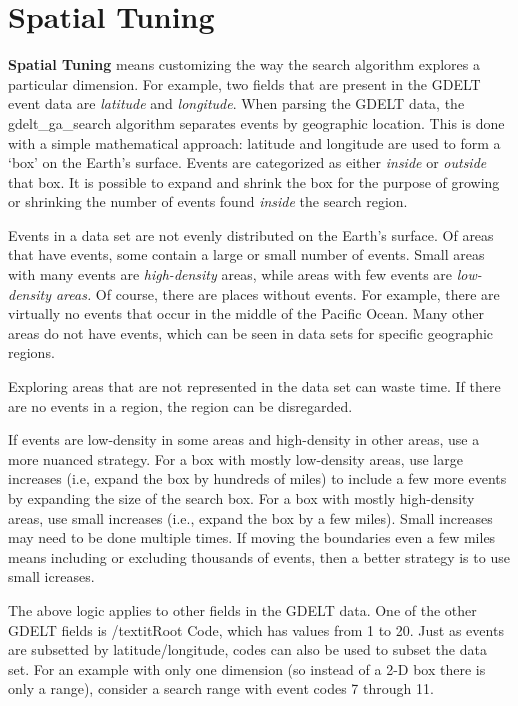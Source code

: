 
\chapter{Spatial Tuning}
\label{chapter:SpatialTuning}

\textbf{Spatial Tuning} means customizing the way the search algorithm explores a particular dimension.
For example, two fields that are present in the GDELT event data are \textit{latitude} and \textit{longitude}.
When parsing the GDELT data, the gdelt\_ga\_search algorithm separates events by geographic location.
This is done with a simple mathematical approach: latitude and longitude are used to form a `box' on the 
Earth's surface. 
Events are categorized as either \textit{inside} or \textit{outside} that box. 
It is possible to expand and shrink the box for the purpose of growing or shrinking the number of events found \textit{inside} the search region.

\par Events in a data set are not evenly distributed on the Earth's surface. 
Of areas that have events, some contain a large or small number of events.
Small areas with many events are \textit{high-density} areas, while areas with few events are \textit{low-density areas.}
Of course, there are places without events. 
For example, there are virtually no events that occur in the middle of the Pacific Ocean. 
Many other areas do not have events, which can be seen in data sets for specific geographic regions. 

\par Exploring areas that are not represented in the data set can waste time. If there are no events in a region, the region can be disregarded.

\par If events are low-density in some areas and high-density in other areas, use a more nuanced strategy. 
For a box with mostly low-density areas, use large increases (i.e, expand the box by hundreds of miles) to include a few more events by expanding the size of the search box.
For a box with mostly high-density areas, use small increases (i.e., expand the box by a few miles). Small increases may need to be done multiple times. 
If moving the boundaries even a few miles means including or excluding thousands of events, then a better strategy is to use small icreases.

\par The above logic applies to other fields in the GDELT data. One of the other GDELT fields is /textit{Root Code}, which has values from 1 to 20. 
Just as events are subsetted by latitude/longitude, codes can also be used to subset the data set.
For an example with only one dimension (so instead of a 2-D box there is only a range), consider a search range with event codes 7 through 11.

